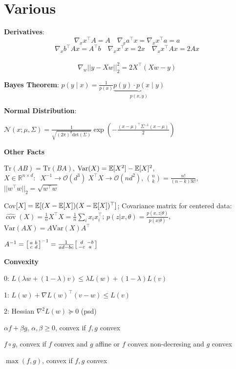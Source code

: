 \section*{Various}

\textbf{Derivatives}:
$$\nabla_x x^\top A = A \quad \nabla_x a^\top x = \nabla_x x^\top a = a$$
$$\nabla_x b^\top A x = A^\top b \quad \nabla_x x^\top x = 2x \quad \nabla_x x^\top A x = 2 Ax$$\\[-20pt]
$$\nabla_w || y-Xw||_2^2 = 2X^\top(Xw-y)$$

\textbf{Bayes Theorem}: $p(y \; | \; x) = \frac{1}{p(x)} \underbrace{p(y) \cdot p(x \; | \; y)}_{p(x,y)}$

\textbf{Normal Distribution}:

$\mathcal{N}(x; \mu, \Sigma) = \frac{1}{\sqrt{(2 \pi)^d \text{det}(\Sigma)}} \exp(-\frac{(x - \mu)^\top \Sigma^{-1} (x-\mu)}{2})$

\textbf{Other Facts}

$\text{Tr}(AB) = \text{Tr}(BA)$, $\text{Var}(X) = \mathbb{E}[X^2] - \mathbb{E}[X]^2$, $X \in \mathbb{R}^{n \times d}: \; \; X^{-1} \rightarrow \mathcal{O}(d^3) \; X^\top X \rightarrow \mathcal{O}(nd^2)$, $\binom{n}{k} = \frac{n!}{(n-k)!k!}$, $||w^\top w||_2 = \sqrt{w^\top w}$
 
Cov$[X] = \mathbb{E}[(X- \mathbb{E}[X])(X- \mathbb{E}[X])^\top]$;
Covariance matrix for centered data: $
\widehat{\operatorname{cov}}(X)=\frac{1}{n}X^\top X=\frac{1}{n}\sum_i x_ix_i^\top
$; $p(z|x,\theta) = \frac{p(x,z|\theta)}{p(x | \theta)}$, $\text{Var}(AX) = A \text{Var}(X) A^\top$


$A^{-1}=
\begin{bsmallmatrix}
a&b \\ 
c&d
\end{bsmallmatrix}^{-1}=\frac{1}{ad-bc}
\begin{bsmallmatrix}
d&-b \\ 
-c&a
\end{bsmallmatrix}
$

\textbf{Convexity}

0: $L(\lambda w + (1 - \lambda)v) \leq \lambda L (w) + (1- \lambda) L(v)$

1: $L(w) + \nabla L(w)^\top (v - w) \leq L(v)$

2: Hessian $\nabla^2 L (w) \succcurlyeq 0$ (psd)

\begin{compactitem}
	\item $\alpha f + \beta g$, $\alpha, \beta \geq 0$, convex if $f, g$ convex
	\item $f \circ g$, convex if $f$ convex and $g$ affine or $f$ convex non-decresing and $g$ convex
	\item $\max(f, g)$, convex if $f,g$ convex
\end{compactitem}

